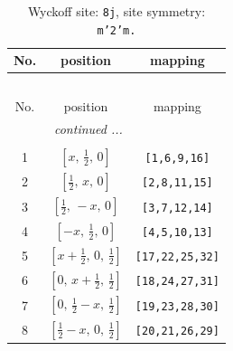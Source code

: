 \documentclass[fleqn,8pt]{jsarticle}
\begin{document}
\begin{longtable}{ccc}
\caption{Wyckoff site: {\tt 8j}, site symmetry: {\tt m'2'm.}}
 \\
 \hline \hline
No. & position & mapping \\ \hline \endfirsthead

\multicolumn{2}{l}{\tablename\ \thetable{}} \\
 \hline \hline
No. & position & mapping \\ \hline \endhead

 \hline \hline
\multicolumn{2}{r}{\footnotesize\it continued ...} \\ \endfoot

 \hline \hline
\multicolumn{2}{r}{} \\ \endlastfoot

1 & $\left[ x,\, \frac{1}{2},\, 0 \right]$ & {\tt [1,6,9,16]} \\ \hline
2 & $\left[ \frac{1}{2},\, x,\, 0 \right]$ & {\tt [2,8,11,15]} \\ \hline
3 & $\left[ \frac{1}{2},\, - x,\, 0 \right]$ & {\tt [3,7,12,14]} \\ \hline
4 & $\left[ - x,\, \frac{1}{2},\, 0 \right]$ & {\tt [4,5,10,13]} \\ \hline
5 & $\left[ x + \frac{1}{2},\, 0,\, \frac{1}{2} \right]$ & {\tt [17,22,25,32]} \\ \hline
6 & $\left[ 0,\, x + \frac{1}{2},\, \frac{1}{2} \right]$ & {\tt [18,24,27,31]} \\ \hline
7 & $\left[ 0,\, \frac{1}{2} - x,\, \frac{1}{2} \right]$ & {\tt [19,23,28,30]} \\ \hline
8 & $\left[ \frac{1}{2} - x,\, 0,\, \frac{1}{2} \right]$ & {\tt [20,21,26,29]} \\
\end{longtable}
\renewcommand{\arraystretch}{1.2}
\end{document}
